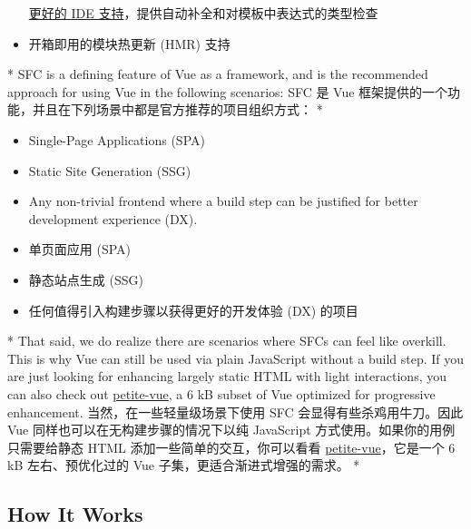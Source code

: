 \begin{paracol}{2}
\begin{itemize}
  \href{https://cn.vuejs.org/guide/scaling-up/tooling.html\#ide-support}{更好的
  IDE 支持}，提供自动补全和对模板中表达式的类型检查
\item
  开箱即用的模块热更新 (HMR) 支持
\end{itemize}
\switchcolumn[0]*%
SFC is a defining feature of Vue as a framework, and is the recommended
approach for using Vue in the following scenarios:
\switchcolumn
SFC 是 Vue
框架提供的一个功能，并且在下列场景中都是官方推荐的项目组织方式：
\switchcolumn[0]*%
\begin{itemize}
\item
  Single-Page Applications (SPA)
\item
  Static Site Generation (SSG)
\item
  Any non-trivial frontend where a build step can be justified for
  better development experience (DX).
\end{itemize}
\switchcolumn
\begin{itemize}
\item
  单页面应用 (SPA)
\item
  静态站点生成 (SSG)
\item
  任何值得引入构建步骤以获得更好的开发体验 (DX) 的项目
\end{itemize}
\switchcolumn[0]*%
That said, we do realize there are scenarios where SFCs can feel like
overkill. This is why Vue can still be used via plain JavaScript without
a build step. If you are just looking for enhancing largely static HTML
with light interactions, you can also check out
\href{https://github.com/vuejs/petite-vue}{petite-vue}, a 6 kB subset of
Vue optimized for progressive enhancement.
\switchcolumn
当然，在一些轻量级场景下使用 SFC 会显得有些杀鸡用牛刀。因此 Vue
同样也可以在无构建步骤的情况下以纯 JavaScript
方式使用。如果你的用例只需要给静态 HTML 添加一些简单的交互，你可以看看
\href{https://github.com/vuejs/petite-vue}{petite-vue}，它是一个 6 kB
左右、预优化过的 Vue 子集，更适合渐进式增强的需求。
\switchcolumn[0]*%
\subsection{How It Works}
\switchcolumn

\end{paracol}
